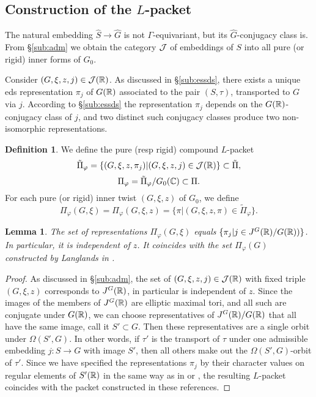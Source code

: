 \documentclass{article}
\newtheorem{lem}[thm]{Lemma}
\theoremstyle{definition}
\newtheorem{dfn}[thm]{Definition}
\numberwithin{equation}{section}
\renewcommand{\-}{\hyp{}}
\newcommand{\warn}[1]{{\leavevmode\color{red}[#1]}}
\begin{document}
\subsection{Construction of the $L$\-packet} \label{sub:cns}

The natural embedding $\hat S \to \hat G$ is not $\Gamma$-equivariant, but its $\hat G$-conjugacy class is. From \S\ref{sub:adm} we obtain the category $\mathcal{J}$ of embeddings of $S$ into all pure (or rigid) inner forms of $G_0$.

Consider $(G,\xi,z,j) \in \mathcal{J}(\mathbb{R})$. As discussed in \S\ref{sub:essds}, there exists a unique eds representation $\pi_j$ of $G(\mathbb{R})$ associated to the pair $(S,\tau)$, transported to $G$ via $j$. According to \S\ref{sub:essds} the representation $\pi_j$ depends on the $G(\mathbb{R})$-conjugacy class of $j$, and two distinct such conjugacy classes produce two non-isomorphic representations.




\begin{dfn}
We define the pure (resp rigid) compound $L$\-packet
\[ \tilde\Pi_\varphi = \{(G,\xi,z,\pi_j)|(G,\xi,z,j) \in \mathcal{J}(\mathbb{R})\} \subset \tilde\Pi, \]
\[ \Pi_\varphi=\tilde\Pi_\varphi/G_0(\mathbb{C}) \subset \Pi. \]
For each pure (or rigid) inner twist $(G,\xi,z)$ of $G_0$, we define
\[ \Pi_\varphi(G,\xi)=\Pi_\varphi(G,\xi,z)=\{\pi | (G,\xi,z,\pi) \in \tilde\Pi_\varphi\}. \]
\end{dfn}

\begin{lem}
The set of representations $\Pi_\varphi(G,\xi)$ equals $\{\pi_j|j \in J^G(\mathbb{R})/G(\mathbb{R}))\}$. In particular, it is independent of $z$. It coincides with the set $\Pi_\varphi(G)$ constructed by Langlands in \cite[\S3]{Lan89}.
\end{lem}
\begin{proof}
	As discussed in \S\ref{sub:adm}, the set of $(G,\xi,z,j) \in \mathcal{J}(\mathbb{R})$ with fixed triple $(G,\xi,z)$ corresponds to $J^G(\mathbb{R})$, in particular is independent of $z$. Since the images of the members of $J^G(\mathbb{R})$ are elliptic maximal tori, and all such are conjugate under $G(\mathbb{R})$, we can choose representatives of $J^G(\mathbb{R})/G(\mathbb{R})$ that all have the same image, call it $S' \subset G$. Then these representatives are a single orbit under $\Omega(S',G)$. In other words, if $\tau'$ is the transport of $\tau$ under one admissible embedding $j : S \to G$ with image $S'$, then all others make out the $\Omega(S',G)$-orbit of $\tau'$. Since we have specified the representations $\pi_j$ by their character values on regular elements of $S'(\mathbb{R})$ in the same way as in \cite[\S3]{Lan89} or \cite[\S4]{AV16}, the resulting $L$-packet coincides with the packet constructed in these references.
\end{proof}
\end{document}
